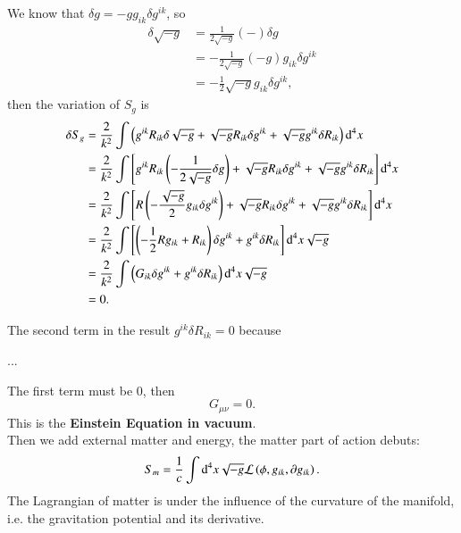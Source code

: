 \documentclass[openany,10pt]{book}
\theoremstyle{definition}
\theoremstyle{definition}
\theoremstyle{remark}
\begin{document}
We know that $\delta g=-gg_{ik}\delta g^{ik}$,  so
\begin{equation}
\begin{aligned}
\delta\sqrt{-g}&=\frac{1}{2\sqrt{-g}}(-)\delta g\\
&=-\frac{1}{2\sqrt{-g}}(-g)g_{ik}\delta g^{ik}\\
&=-\frac{1}{2}\sqrt{-g}g_{ik}\delta g^{ik},
\end{aligned}
\end{equation}
then the variation of $S_g$ is
\begin{equation}\begin{aligned}
    \delta S_g
        &=\frac{2}{k^2}\int \left(g^{ik}R_{ik}\delta\sqrt{-g}+\sqrt{-g}R_{ik}\delta g^{ik}+\sqrt{-g}g^{ik}\delta R_{ik}\right){\rm d}^4x\\
        &=\frac{2}{k^2}\int \left[g^{ik}R_{ik}\left(-\frac{1}{2\sqrt{-g}}\delta g\right)+\sqrt{-g}R_{ik}\delta g^{ik}+\sqrt{-g}g^{ik}\delta R_{ik}\right]{\rm d}^4x\\
        &=\frac{2}{k^2}\int \left[R\left(-\frac{\sqrt{-g}}{2}g_{ik}\delta g^{ik}\right)+\sqrt{-g}R_{ik}\delta g^{ik}+\sqrt{-g}g^{ik}\delta R_{ik}\right]{\rm d}^4x\\
        &=\frac{2}{k^2}\int \left[\left(-\frac{1}{2}Rg_{ik}+R_{ik}\right)\delta g^{ik}+g^{ik}\delta R_{ik}\right]{\rm d}^4x\sqrt{-g}\\
        &=\frac{2}{k^2}\int \left(G_{ik}\delta g^{ik}+g^{ik}\delta R_{ik}\right){\rm d}^4x\sqrt{-g}\\
        &=0.
\end{aligned}
\end{equation}


The second term in the result $g^{ik}\delta R_{ik}=0$ because

...





 The first term must be 0, then
\begin{equation}
    G_{\mu\nu}=0.
\end{equation}
This is the \textbf{Einstein Equation in vacuum}.\\

Then we add external matter and energy, the matter part of action debuts:
\begin{equation}
    S_m=\frac1c\int{\rm d}^4x\sqrt{-g} \mathcal{L}\left(\phi, g_{ik}, \partial g_{ik}\right).
\end{equation}
The Lagrangian of matter is under the influence of the curvature of the manifold, i.e. the gravitation potential and its derivative. %
\end{document}
